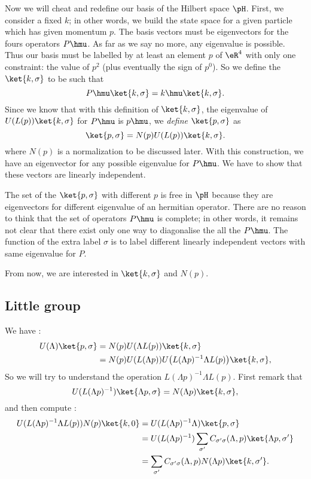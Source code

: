 Now we will cheat and redefine our basis of the Hilbert space $\pH$. First, we consider a fixed $k$; in other words, we build the state space for a given particle which has given momentum $p$.  The basis vectors must be eigenvectors for the fours operators $P\hmu$. As far as we say no more, any eigenvalue is possible. Thus our basis must be labelled by at least an element $p$ of $\eR^4$ with only one constraint: the value of $p^2$ (plus eventually the sign of $p^0$). So we define the $\ket{k,\sigma}$ to be such that
\[
   P\hmu\ket{k,\sigma}=k\hmu\ket{k,\sigma}.
\]
Since we know that with this definition of $\ket{k,\sigma}$, the eigenvalue of $U(L(p))\ket{k,\sigma}$ for $P\hmu$ is $p\hmu$, we \emph{define} $\ket{p,\sigma}$ as
\begin{equation}
  \ket{p,\sigma}=N(p)U(L(p))\ket{k,\sigma}.
\end{equation}
where $N(p)$ is a normalization to be discussed later. With this construction, we have an eigenvector for any possible eigenvalue for $P\hmu$. We have to show that these vectors are linearly independent.

The set of the $\ket{p,\sigma}$ with different $p$ is free in $\pH$ because they are eigenvectors for different eigenvalue of an hermitian operator. There are no reason to think that the set of operators $P\hmu$ is complete; in other words, it remains not clear that there exist only one way to diagonalise the all the $P\hmu$. The function of the extra label $\sigma$ is to label different linearly independent vectors with same eigenvalue for $P$.

From now, we are interested in $\ket{k,\sigma}$ and $N(p)$.

\subsection{Little group}

We have :
\begin{equation}
\begin{split}
  U(\Lambda)\ket{p,\sigma}&=N(p)U(\Lambda L(p))\ket{k,\sigma}\\
                          &=N(p)U(L(\Lambda p))U\big(  L(\Lambda p)^{-1}\Lambda L(p) \big)\ket{k,\sigma},
\end{split}
\end{equation}
So we will try to understand the operation $L(\Lambda p)^{-1}\Lambda L(p)$. First remark that
\[
   U(L(\Lambda p)^{-1})\ket{\Lambda p,\sigma}=N(\Lambda p)\ket{k,\sigma},
\]
and then compute :
\begin{equation}
\begin{split}
  U(L(\Lambda p)^{-1}\Lambda L(p) )N(p)\ket{k,0}&=U(L(\Lambda p)^{-1}\Lambda)\ket{p,\sigma}\\
                                               &=U(L(\Lambda p)^{-1})\sum_{\sigma'}
					         C_{\sigma'\sigma}(\Lambda,p)\ket{\Lambda p,\sigma'}\\
					       &=\sum_{\sigma'}C_{\sigma'\sigma}(\Lambda,p)
					         N(\Lambda p)\ket{k,\sigma'}.
\end{split}
\end{equation}

